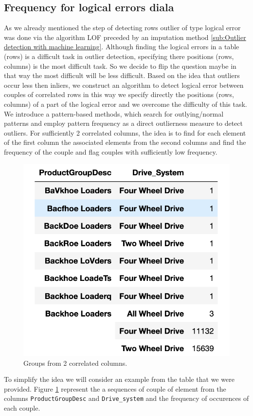 \documentclass{article}
\begin{document}
\subsection{Frequency for logical errors diala} %
\label{sub:Frequency for logical errors}
As we already mentioned the step of detecting rows outlier of type logical error was done via the algorithm LOF preceded by an imputation method \ref{sub:Outlier detection with machine learning}.
Although finding the logical errors in a table (rows) is a difficult task in outlier detection, specifying there positions (rows, columns) is the most difficult task.
So we decide to flip the question maybe in that way the most difficult will be less difficult.
Based on the idea that outliers occur less then inliers, we construct an algorithm to detect logical error  between couples of correlated rows in this way we specify directly the positions (rows, columns) of a part of the logical error and we overcome the difficulty of this task.
We introduce a pattern-based methods, which search for outlying/normal patterns and employ pattern frequency as a direct outlierness measure to detect outliers.
For sufficiently 2 correlated columns, the idea is to find for each element of the first column the associated elements from the second columns and find the frequency of the couple and flag couples with sufficiently low frequency.
\begin{figure}[H]
    \centering
    \includegraphics[width=0.6\linewidth]{picture/logic_err.png}
    \caption{Groups from 2 correlated columns.}
    \label{fig:logic_err}
\end{figure}
To simplify the idea we will consider an example from the table that we were provided. Figure \ref{fig:logic_err} represent the a sequences of couple of element from the columns \texttt{ProductGroupDesc} and \texttt{Drive\_system} and the frequency of occurences of each couple.
\end{document}
